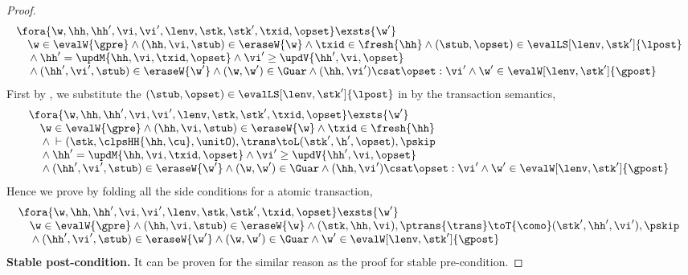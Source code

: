\begin{proof}
\begin{equation}
\label{equ:repartition}
\begin{array}{@{}l}
    \fora{\w,  \hh, \hh', \vi, \vi', \lenv, \stk, \stk', \txid, \opset} \exsts{\w'} \\
    \quad \w \in \evalW{\gpre}
    \land (\hh, \vi, \stub) \in \eraseW{\w}
    \land \txid \in \fresh{\hh} 
    \land (\stub,\opset) \in \evalLS[\lenv, \stk']{\lpost} \\
    \quad {} \land \hh' = \updM{\hh, \vi, \txid, \opset}  
    \land \vi' \geq \updV{\hh', \vi, \opset} \\
    \quad {} \land (\hh',\vi', \stub) \in \eraseW{\w'}
    \land (\w, \w') \in \Guar 
    \land (\hh, \vi') \csat \opset : \vi' 
    \land \w' \in \evalW[\lenv, \stk']{\gpost}
\end{array}
\end{equation}
First by , we substitute the \( (\stub, \opset) \in \evalLS[\lenv, \stk']{\lpost}\) in  by the transaction semantics,
\begin{equation}
\label{equ:combined-transaction-sound}
\begin{array}{@{}l}
    \fora{\w,  \hh, \hh', \vi, \vi', \lenv, \stk, \stk', \txid, \opset} \exsts{\w'} \\
    \quad \w \in \evalW{\gpre}
    \land (\hh, \vi, \stub) \in \eraseW{\w}
    \land \txid \in \fresh{\hh}  \\
    \quad {} \land {} \vdash (\stk, \clpsHH{\hh, \cu}, \unitO), \trans \toL (\stk', \h', \opset), \pskip  \\
    \quad {} \land \hh' = \updM{\hh, \vi, \txid, \opset}  
    \land \vi' \geq \updV{\hh', \vi, \opset} \\
    \quad {} \land (\hh',\vi', \stub) \in \eraseW{\w'}
    \land (\w, \w') \in \Guar 
    \land (\hh, \vi') \csat \opset : \vi' 
    \land \w' \in \evalW[\lenv, \stk']{\gpost}
\end{array}
\end{equation}
Hence we prove  by folding all the side conditions for a atomic transaction,
\[
\begin{array}{@{}l}
    \fora{\w,  \hh, \hh', \vi, \vi', \lenv, \stk, \stk', \txid, \opset} \exsts{\w'} \\
    \quad \w \in \evalW{\gpre}
    \land (\hh, \vi, \stub) \in \eraseW{\w} 
    \land {} (\stk, \hh, \vi), \ptrans{\trans} \toT{\como} (\stk', \hh', \vi'), \pskip  \\
    \quad {} \land (\hh',\vi', \stub) \in \eraseW{\w'}
    \land (\w, \w') \in \Guar 
    \land \w' \in \evalW[\lenv, \stk']{\gpost}
\end{array}
\]
\textbf{Stable post-condition.} 
It can be proven for the similar reason as the proof for stable pre-condition.


\end{proof}
